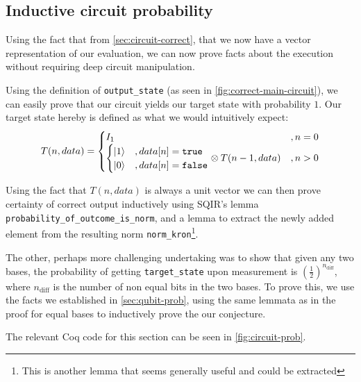 \documentclass{article}
\begin{document}
\subsection{Inductive circuit probability}\label{circuit-prob}
Using the fact that from \cref{sec:circuit-correct}, that we now have a vector representation of our evaluation, we can now prove facts about the execution without requiring deep circuit manipulation.

Using the definition of \texttt{output\_state} (as seen in \cref{fig:correct-main-circuit}), we can easily prove that our circuit yields our target state with probability $1$. 
Our target state hereby is defined as what we would intuitively expect:
$$T(n,data) = \begin{cases}
I_1&, n =0\\
\begin{cases}
\ket{1}&, data[n] = \texttt{true}\\
\ket{0}&, data[n] = \texttt{false}
\end{cases} \otimes T(n-1,data)&, n>0
\end{cases}$$

Using the fact that $T(n,data)$ is always a unit vector we can then prove certainty of correct output inductively using SQIR's lemma \texttt{probability\_of\_outcome\_is\_norm}, and a lemma to extract the newly added element from the resulting norm \texttt{norm\_kron}\footnote{This is another lemma that seems generally useful and could be extracted}. 

The other, perhaps more challenging undertaking was to show that given any two bases, the probability of getting \texttt{target\_state} upon measurement is $(\frac{1}{2})^{n_{\text{diff}}}$, where $n_{\text{diff}}$ is the number of non equal bits in the two bases. To prove this, we use the facts we established in \cref{sec:qubit-prob}, using the same lemmata as in the proof for equal bases to inductively prove the our conjecture.

The relevant Coq code for this section can be seen in \cref{fig:circuit-prob}.
\end{document}
